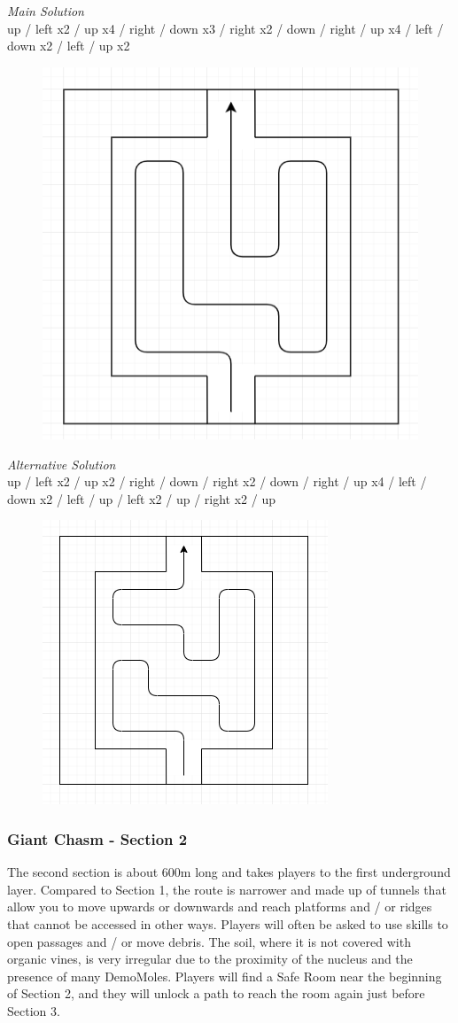 \textit{Main Solution}\\
up / left x2 / up x4 / right / down x3 / right x2 / down / right / up x4 / left / down x2 / left / up x2\\

\begin{figure}[H]
	\centering
	\includegraphics[width=0.5\linewidth]{images/puzzle/puzzle_011.png}
\end{figure}

\textit{Alternative Solution}\\
up / left x2 / up x2 / right / down / right x2 / down / right / up x4 / left / down x2 / left / up / left x2 / up / right x2 / up\\

\begin{figure}[H]
	\centering
	\includegraphics[width=0.5\linewidth]{images/puzzle/puzzle_012.png}
\end{figure}
\newpage


\subsubsection{Giant Chasm - Section 2}
The second section is about 600m long and takes players to the first underground layer.
Compared to Section 1, the route is narrower and made up of tunnels that allow you to move upwards or downwards and reach platforms and / or ridges that cannot be accessed in other ways. Players will often be asked to use skills to open passages and / or move debris. The soil, where it is not covered with organic vines, is very irregular due to the proximity of the nucleus and the presence of many DemoMoles. Players will find a Safe Room near the beginning of Section 2, and they will unlock a path to reach the room again just before Section 3.

